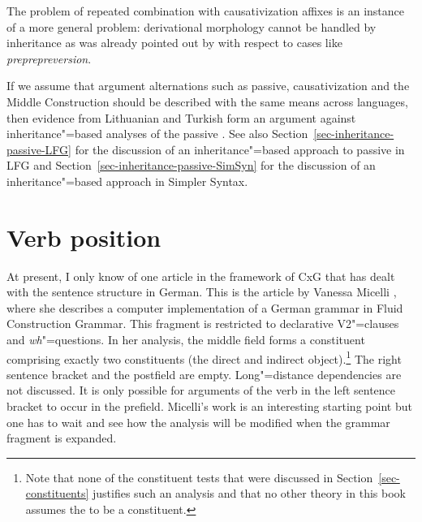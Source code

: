 \addlines
The problem of repeated combination with causativization affixes is an instance of a more general
problem: derivational morphology cannot be handled by inheritance as was already pointed out by
\citet{KN93a} with respect to cases like \emph{preprepreversion}.

If we assume that argument alternations such as passive, causativization and the Middle Construction should be described with the same means
across languages, then evidence from Lithuanian and Turkish form an argument against
inheritance"=based analyses of the passive \citep{Mueller2006d,Mueller2007d,MWArgSt}. See also
Section~\ref{sec-inheritance-passive-LFG} for the discussion of an inheritance"=based approach to passive in LFG and Section~\ref{sec-inheritance-passive-SimSyn}
for the discussion of an inheritance"=based approach in Simpler Syntax.

\section{Verb position}

At present, I only know of one article in the framework of CxG that has dealt with the sentence structure
in German. This is the article by Vanessa Micelli
\citeyearpar{Micelli2012a}, where she describes a computer implementation of a German grammar in Fluid Construction Grammar\indexfcg.
This fragment is restricted to declarative V2"=clauses and \emph{wh}"=questions. In her analysis, the middle field forms a constituent
comprising exactly two constituents (the direct and indirect object).\footnote{
  Note that none of the constituent tests that were discussed in Section~\ref{sec-constituents}
  justifies such an analysis and that no other theory in this book assumes the \mf to be a constituent.%
} The right sentence bracket and the postfield are empty.
Long"=distance dependencies are not discussed. It is only possible for arguments of the verb in the left sentence bracket to occur
in the prefield. Micelli's work is an interesting starting point but one has to wait and see how the analysis will be  modified when
the grammar fragment is expanded.

